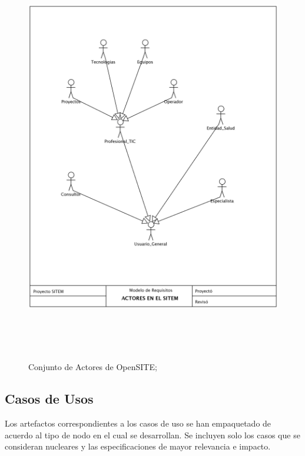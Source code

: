\begin{figure}
 \centering
 \includegraphics[width=156mm, height=182mm]{actores.png}
 \caption{Conjunto de Actores de OpenSITE;}
 \label{actores}
\end{figure}

\subsection{Casos de Usos}
Los artefactos correspondientes a los casos de uso se han empaquetado de acuerdo al tipo de nodo en el cual se desarrollan. Se incluyen solo los casos que se consideran nucleares y las especificaciones de mayor relevancia e impacto.

